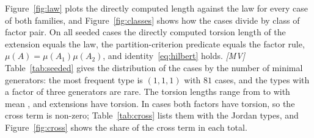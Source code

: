 \documentclass[11pt]{article}
\theoremstyle{definition}
\theoremstyle{remark}
\newcommand{\mMV}{\emph{[MV]}}
\begin{document}
Figure~\ref{fig:law} plots the directly computed length against the law for every case of both families, and Figure~\ref{fig:classes} shows how the cases divide by class of factor pair. On all \NSeeded{} seeded cases the directly computed torsion length of the extension equals the law, the partition-criterion predicate equals the factor rule,
$\mu(A)=\mu(A_1)\mu(A_2)$, and identity~\eqref{eq:hilbert} holds. \mMV{} Table~\ref{tab:seeded} gives the distribution of the cases by the number of minimal generators: the
most frequent type is $(1,1,1)$ with $81$ cases, and the types with a factor of three generators are rare. The torsion lengths range from \SeededMinTorsion{} to
\SeededMaxTorsion{} with mean \SeededMeanTorsion{}, and \NSeededNonzero{} extensions have torsion. In \NSeededCross{} cases both factors have torsion, so the cross term is
non-zero; Table~\ref{tab:cross} lists them with the Jordan types, and Figure~\ref{fig:cross} shows the share of the cross term in each total.

\begin{table}[t]
\centering\footnotesize
\resizebox{\textwidth}{!}{}
\caption{The \NSeeded{} seeded gluings by the numbers of minimal generators of the two factors and of the extension: cases, cases with non-zero torsion, range
and mean of the directly computed torsion length, cases with torsion in both factors, and cases where the law and the factor rule hold. Source: EXP-068 results.}\label{tab:seeded}
\end{table}

\begin{table}[t]
\centering\footnotesize
\resizebox{\textwidth}{!}{}
\caption{Cases by class of the two factor ideals, for both families: principal, with the Huneke--Wiegand property, or counterexample. The seeded family has no counterexample
factor; the second family has \NHardCE{}, and its \NHardCEItself{} extensions with a principal partner are themselves counterexamples. No case has two counterexample factors.}\label{tab:classes}
\end{table}
\end{document}
